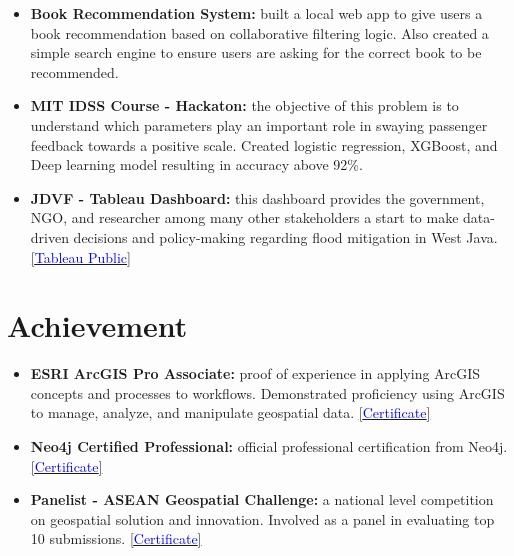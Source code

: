 \documentclass[a4paper, 11pt]{article}
\newcommand{\resumeItem}[2]{
    \item\small{
        \textbf{#1}{#2 \vspace{-2pt}}
    }
}
\newcommand{\resumeItemListStart}{\begin{itemize}[leftmargin=*]\setlength\itemsep{0em}\vspace{-1pt}}
\newcommand{\resumeItemListEnd}{\end{itemize}\vspace{-5pt}}
\begin{document}
    \resumeItemListStart
    \resumeItem{Book Recommendation System:}{ built a local web app to give users a book
    recommendation based on collaborative filtering logic. Also created a simple search
    engine to ensure users are asking for the correct book to be recommended.
    \href{https://github.com/amrirasyidi/book_recommendation}\faGithub}
    \resumeItem{MIT IDSS Course - Hackaton:}{ the objective of this problem is to
    understand which parameters play an important role in swaying passenger feedback
    towards a positive scale. Created logistic regression, XGBoost, and Deep learning
    model resulting in accuracy above 92\%. 
    \href{https://github.com/amrirasyidi/mit_idss_hackaton}\faGithub}
    \resumeItem{JDVF - Tableau Dashboard:}{ this dashboard provides the government, NGO,
    and researcher among many other stakeholders a start to make data-driven decisions
    and policy-making regarding flood mitigation in West Java. 
    \href{https://public.tableau.com/app/profile/faisal.putra/viz/Book1_16671939458310/DashboardFINAL}{[\textcolor{blue}{Tableau Public}]}}
    \resumeItemListEnd

    \vspace{-20pt}
    \section{Achievement}
    \resumeItemListStart

    \resumeItem{ESRI ArcGIS Pro Associate:}{ proof of experience in applying ArcGIS concepts and processes to workflows. Demonstrated proficiency using ArcGIS to manage, analyze, and manipulate geospatial data.
    \href{https://www.credly.com/badges/b75a29fc-af70-44c0-8945-9f3ed80196f3/}{[\textcolor{blue}{Certificate}]}}

    \resumeItem{Neo4j Certified Professional:}{ official professional certification from 
    Neo4j.
    \href{https://graphacademy.neo4j.com/c/4cb304b6-5a5b-4f45-96cf-1840a2982e55/}{[\textcolor{blue}{Certificate}]}}

    \resumeItem{Panelist - ASEAN Geospatial Challenge:}{ a national level competition on 
    geospatial solution and innovation. Involved as a panel in evaluating top 10 submissions.
    \href{https://drive.google.com/file/d/1NkMhFTBGqnOs2HpcvlLVMFIajq2MSO9k/view?usp=sharing}{[\textcolor{blue}{Certificate}]}}

    \resumeItemListEnd
    
    \vspace{-5pt}
\end{document}
